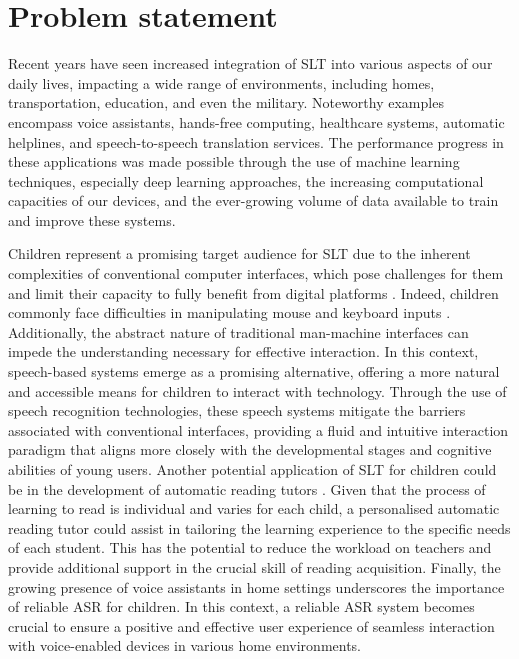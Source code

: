\section{Problem statement}
Recent years have seen increased integration of \ac{SLT} into various aspects of our daily lives, impacting a wide range of environments, including homes, transportation, education, and even the military. Noteworthy examples encompass voice assistants, hands-free computing, healthcare systems, automatic helplines, and speech-to-speech translation services. The performance progress in these applications was made possible through the use of machine learning techniques, especially deep learning approaches, the increasing computational capacities of our devices, and the ever-growing volume of data available to train and improve these systems.

Children represent a promising target audience for \ac{SLT} due to the inherent complexities of conventional computer interfaces, which pose challenges for them and limit their capacity to fully benefit from digital platforms \cite{lu1992mastering}. Indeed, children commonly face difficulties in manipulating mouse and keyboard inputs \cite{lu1992mastering}. Additionally, the abstract nature of traditional man-machine interfaces can impede the understanding necessary for effective interaction. In this context, speech-based systems emerge as a promising alternative, offering a more natural and accessible means for children to interact with technology. Through the use of speech recognition technologies, these speech systems mitigate the barriers associated with conventional interfaces, providing a fluid and intuitive interaction paradigm that aligns more closely with the developmental stages and cognitive abilities of young users. Another potential application of \ac{SLT} for children could be in the development of automatic reading tutors \cite{wise2023learning}. Given that the process of learning to read is individual and varies for each child, a personalised automatic reading tutor could assist in tailoring the learning experience to the specific needs of each student. This has the potential to reduce the workload on teachers and provide additional support in the crucial skill of reading acquisition. Finally, the growing presence of voice assistants in home settings underscores the importance of reliable \ac{ASR} for children. In this context, a reliable \ac{ASR} system becomes crucial to ensure a positive and effective user experience of seamless interaction with voice-enabled devices in various home environments.

